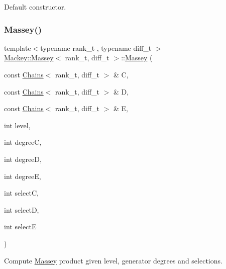 Default constructor. 

\mbox{\label{classMackey_1_1Massey_aea86037b138dc1c2682f5522279e551e}} 
\subsubsection{\texorpdfstring{Massey()}{Massey()}\hspace{0.1cm}{\footnotesize\ttfamily [2/3]}}
{\footnotesize\ttfamily template$<$typename rank\+\_\+t , typename diff\+\_\+t $>$ \\
\hyperlink{classMackey_1_1Massey}{Mackey\+::\+Massey}$<$ rank\+\_\+t, diff\+\_\+t $>$\+::\hyperlink{classMackey_1_1Massey}{Massey} (\begin{DoxyParamCaption}\item[{const \hyperlink{classMackey_1_1Chains}{Chains}$<$ rank\+\_\+t, diff\+\_\+t $>$ \&}]{C,  }\item[{const \hyperlink{classMackey_1_1Chains}{Chains}$<$ rank\+\_\+t, diff\+\_\+t $>$ \&}]{D,  }\item[{const \hyperlink{classMackey_1_1Chains}{Chains}$<$ rank\+\_\+t, diff\+\_\+t $>$ \&}]{E,  }\item[{int}]{level,  }\item[{int}]{degreeC,  }\item[{int}]{degreeD,  }\item[{int}]{degreeE,  }\item[{int}]{selectC,  }\item[{int}]{selectD,  }\item[{int}]{selectE }\end{DoxyParamCaption})}



Compute \hyperlink{classMackey_1_1Massey}{Massey} product given level, generator degrees and selections. 

\mbox{\label{classMackey_1_1Massey_a40730505997c03b7c5c05e022ea23f47}} 

